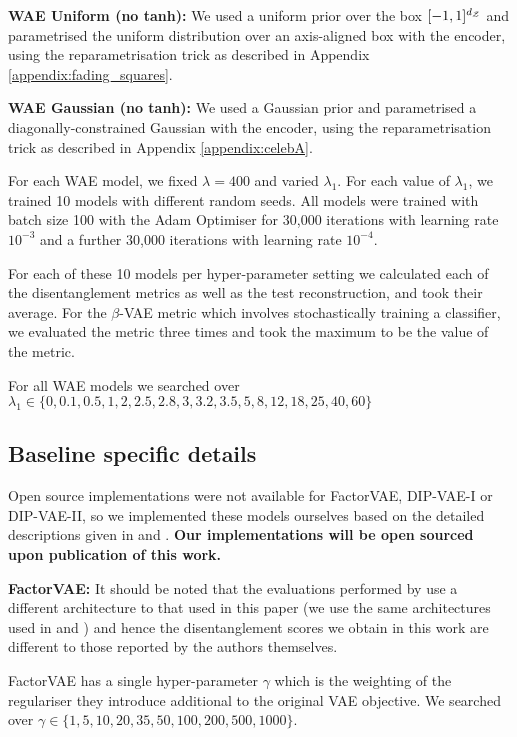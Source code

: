 \textbf{WAE Uniform (no tanh):} We used a uniform prior over the box $[-1, 1]^{d_{\mathcal{Z}}}$ and parametrised the uniform distribution over an axis-aligned box with the encoder, using the reparametrisation trick as described in Appendix \ref{appendix:fading_squares}.

\textbf{WAE Gaussian (no tanh):} We used a Gaussian prior and parametrised a diagonally-constrained Gaussian with the encoder, using the reparametrisation trick as described in Appendix \ref{appendix:celebA}. 

For each WAE model, we fixed $\lambda=400$ and varied $\lambda_1$. For each value of $\lambda_1$, we trained 10 models with different random seeds. All models were trained with batch size 100 with the Adam Optimiser for 30,000 iterations with learning rate $10^{-3}$ and a further 30,000 iterations with learning rate $10^{-4}$.

For each of these 10 models per hyper-parameter setting we calculated each of the disentanglement metrics as well as the test reconstruction, and took their average. For the $\beta$-VAE metric which involves stochastically training a classifier, we evaluated the metric three times and took the maximum to be the value of the metric. 

For all WAE models we searched over $\lambda_1 \in \{0, 0.1, 0.5, 1, 2, 2.5, 2.8, 3, 3.2, 3.5, 5, 8, 12, 18, 25, 40, 60\}$ 

\subsection{Baseline specific details}

Open source implementations were not available for FactorVAE, DIP-VAE-I or DIP-VAE-II, so we implemented these models ourselves based on the detailed descriptions given in \cite{kim2018disentangling} and \cite{kumar2017variational}. \textbf{Our implementations will be open sourced upon publication of this work.}

\textbf{FactorVAE:} It should be noted that the evaluations performed by \cite{kim2018disentangling} use a different architecture to that used in this paper (we use the same architectures used in \cite{HM+17} and \cite{kumar2017variational}) and hence the disentanglement scores we obtain in this work are different to those reported by the authors themselves.

FactorVAE has a single hyper-parameter $\gamma$ which is the weighting of the regulariser they introduce additional to the original VAE objective. We searched over $\gamma \in \{1, 5, 10, 20, 35, 50, 100, 200, 500, 1000\}$. 

